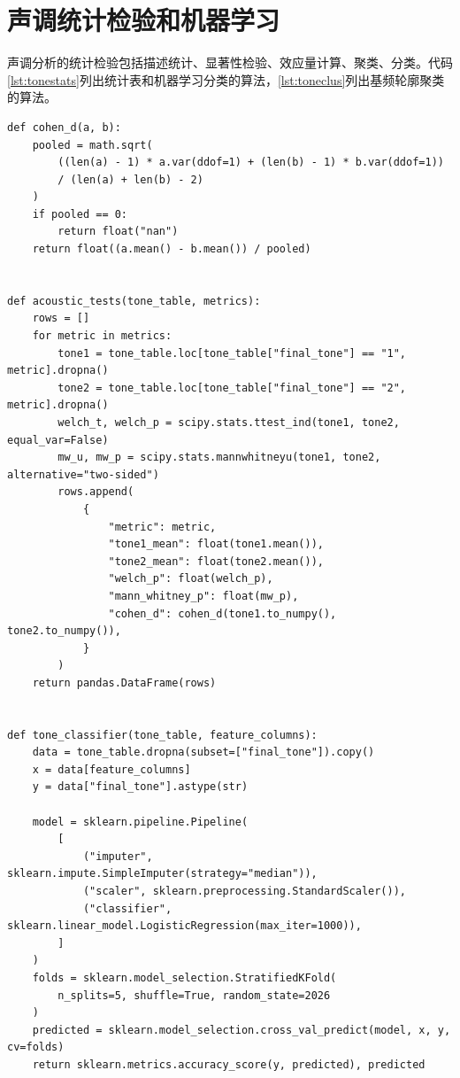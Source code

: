 \section{声调统计检验和机器学习}

声调分析的统计检验包括描述统计、显著性检验、效应量计算、聚类、分类。代码\ref{lst:tonestats}列出统计表和机器学习分类的算法，\ref{lst:toneclus}列出基频轮廓聚类的算法。

\begin{lstlisting}[caption={统计检验与机器学习分类},label={lst:tonestats}]
def cohen_d(a, b):
    pooled = math.sqrt(
        ((len(a) - 1) * a.var(ddof=1) + (len(b) - 1) * b.var(ddof=1))
        / (len(a) + len(b) - 2)
    )
    if pooled == 0:
        return float("nan")
    return float((a.mean() - b.mean()) / pooled)


def acoustic_tests(tone_table, metrics):
    rows = []
    for metric in metrics:
        tone1 = tone_table.loc[tone_table["final_tone"] == "1", metric].dropna()
        tone2 = tone_table.loc[tone_table["final_tone"] == "2", metric].dropna()
        welch_t, welch_p = scipy.stats.ttest_ind(tone1, tone2, equal_var=False)
        mw_u, mw_p = scipy.stats.mannwhitneyu(tone1, tone2, alternative="two-sided")
        rows.append(
            {
                "metric": metric,
                "tone1_mean": float(tone1.mean()),
                "tone2_mean": float(tone2.mean()),
                "welch_p": float(welch_p),
                "mann_whitney_p": float(mw_p),
                "cohen_d": cohen_d(tone1.to_numpy(), tone2.to_numpy()),
            }
        )
    return pandas.DataFrame(rows)


def tone_classifier(tone_table, feature_columns):
    data = tone_table.dropna(subset=["final_tone"]).copy()
    x = data[feature_columns]
    y = data["final_tone"].astype(str)

    model = sklearn.pipeline.Pipeline(
        [
            ("imputer", sklearn.impute.SimpleImputer(strategy="median")),
            ("scaler", sklearn.preprocessing.StandardScaler()),
            ("classifier", sklearn.linear_model.LogisticRegression(max_iter=1000)),
        ]
    )
    folds = sklearn.model_selection.StratifiedKFold(
        n_splits=5, shuffle=True, random_state=2026
    )
    predicted = sklearn.model_selection.cross_val_predict(model, x, y, cv=folds)
    return sklearn.metrics.accuracy_score(y, predicted), predicted
\end{lstlisting}

